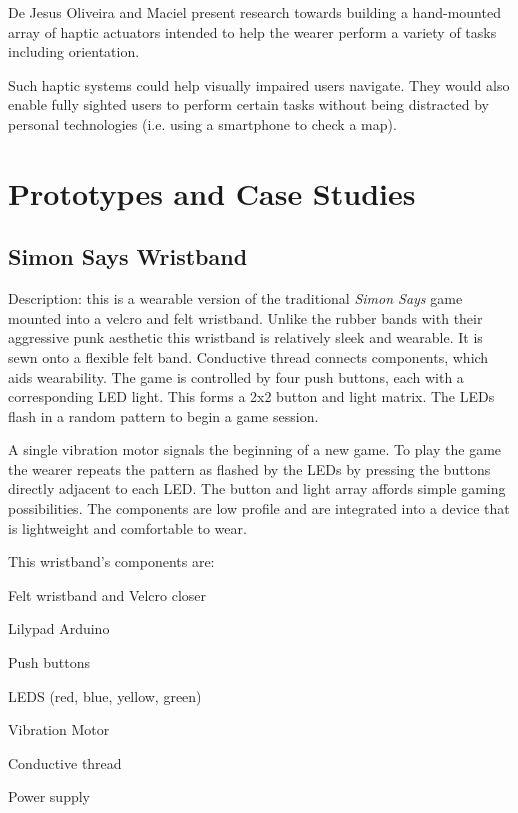 \documentclass{chi-ext}
\begin{document}
De Jesus Oliveira and Maciel \cite{Jesus-Oliveira:2013aa} present research towards building a hand-mounted array of haptic actuators intended to help the wearer perform a variety of tasks including orientation. 


Such haptic systems could help visually impaired users navigate. They would also enable fully sighted users to perform certain tasks without being distracted by personal technologies (i.e. using a smartphone to check a map).


\section{Prototypes and Case Studies}
\subsection{Simon Says Wristband}
Description: this is a wearable version of the traditional \emph{Simon Says} game mounted into a velcro and felt wristband. Unlike the rubber bands with their aggressive punk aesthetic this wristband is relatively sleek and wearable. It is sewn onto a flexible felt band. Conductive thread connects components, which aids wearability. The game is controlled by four push buttons, each with a corresponding LED light. This forms a 2x2 button and light matrix. The LEDs flash in a random pattern to begin a game session. 

A single vibration motor signals the beginning of a new game. To play the game the wearer repeats the pattern as flashed by the LEDs by pressing the buttons directly adjacent to each LED. The button and light array affords simple gaming possibilities. The components are low profile and are integrated into a device that is lightweight and comfortable to wear. 

This wristband's components are:
\begin{inparaenum}
\item Felt wristband and Velcro closer
\item Lilypad Arduino
\item Push buttons
\item LEDS (red, blue, yellow, green)
\item Vibration Motor
\item Conductive thread
\item Power supply
\end{inparaenum}
\end{document}
